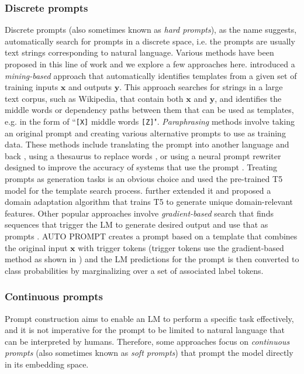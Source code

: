 \subsubsection{Discrete prompts}
Discrete prompts (also sometimes known as \textit{hard prompts}), as the name suggests, automatically search for prompts in a discrete space, i.e. the prompts are usually text strings corresponding to natural language. Various methods have been proposed in this line of work and we explore a few approaches here. 
\newline
\citet{jiang-etal-2020-know} introduced a \textit{mining-based} approach that automatically identifies templates from a given set of training inputs $\bm{x}$ and outputs $\bm{y}$. This approach searches for strings in a large text corpus, such as Wikipedia, that contain both $\bm{x}$ and $\bm{y}$, and identifies the middle words or dependency paths between them that can be used as templates, e.g. in the form of ``\texttt{[X]} middle words \texttt{[Z]}".  
\newline
\textit{Paraphrasing} methods involve taking an original prompt and creating various alternative prompts to use as training data. These methods include translating the prompt into another language and back \citep{jiang-etal-2020-know}, using a thesaurus to replace words \citep{yuan2021bartscore}, or using a neural prompt rewriter designed to improve the accuracy of systems that use the prompt \citep{haviv-etal-2021-bertese}.
\newline
Treating prompts as generation tasks is an obvious choice and \citet{gao2021making} used the pre-trained T5 model for the template search process. \citet{bendavid2021pada} further extended it and proposed a domain adaptation algorithm that trains T5 to generate unique domain-relevant features. 
\newline
Other popular approaches involve \textit{gradient-based} search that finds sequences that trigger the LM to generate desired output and use that as prompts \citep{DBLP:conf/emnlp/WallaceFKGS19}. \textsc{AUTO PROMPT} \citep{autoprompt:emnlp20} creates a prompt based on a template that combines the original input $\bm{x}$ with trigger tokens (trigger tokens use the gradient-based method as shown in \citep{DBLP:conf/emnlp/WallaceFKGS19}) and the LM predictions for the prompt is then converted to class probabilities by marginalizing over a set of associated label tokens. 

\subsubsection{Continuous prompts}
Prompt construction aims to enable an LM to perform a specific task effectively, and it is not imperative for the prompt to be limited to natural language that can be interpreted by humans. Therefore, some approaches focus on \textit{continuous prompts} (also sometimes known as \textit{soft prompts}) that prompt the model directly in its embedding space.

